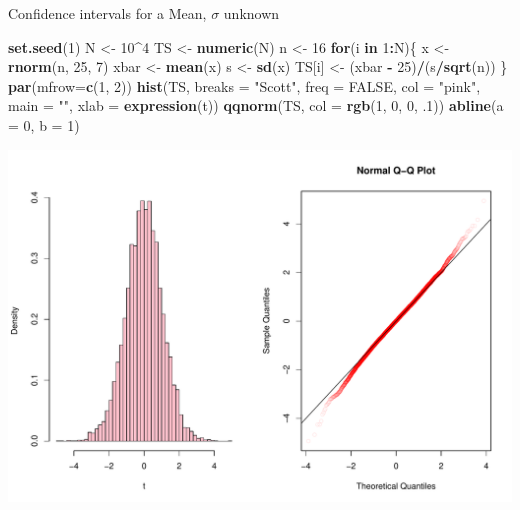 \documentclass[
  ignorenonframetext,
]{beamer}
\newenvironment{Shaded}{\begin{snugshade}}{\end{snugshade}}
\newcommand{\AttributeTok}[1]{\textcolor[rgb]{0.13,0.29,0.53}{#1}}
\newcommand{\ConstantTok}[1]{\textcolor[rgb]{0.56,0.35,0.01}{#1}}
\newcommand{\ControlFlowTok}[1]{\textcolor[rgb]{0.13,0.29,0.53}{\textbf{#1}}}
\newcommand{\DecValTok}[1]{\textcolor[rgb]{0.00,0.00,0.81}{#1}}
\newcommand{\FunctionTok}[1]{\textcolor[rgb]{0.13,0.29,0.53}{\textbf{#1}}}
\newcommand{\NormalTok}[1]{#1}
\newcommand{\OtherTok}[1]{\textcolor[rgb]{0.56,0.35,0.01}{#1}}
\newcommand{\SpecialCharTok}[1]{\textcolor[rgb]{0.81,0.36,0.00}{\textbf{#1}}}
\newcommand{\StringTok}[1]{\textcolor[rgb]{0.31,0.60,0.02}{#1}}
\begin{document}
\begin{frame}[fragile]{Confidence intervals for a Mean, \(\sigma\)
unknown}
\protect\hypertarget{confidence-intervals-for-a-mean-sigma-unknown-1}{}
\tiny

\begin{Shaded}
\begin{Highlighting}[]
\FunctionTok{set.seed}\NormalTok{(}\DecValTok{1}\NormalTok{)}
\NormalTok{N }\OtherTok{\textless{}{-}} \DecValTok{10}\SpecialCharTok{\^{}}\DecValTok{4}
\NormalTok{TS }\OtherTok{\textless{}{-}} \FunctionTok{numeric}\NormalTok{(N)}
\NormalTok{n }\OtherTok{\textless{}{-}} \DecValTok{16}
\ControlFlowTok{for}\NormalTok{(i }\ControlFlowTok{in} \DecValTok{1}\SpecialCharTok{:}\NormalTok{N)\{}
\NormalTok{  x }\OtherTok{\textless{}{-}} \FunctionTok{rnorm}\NormalTok{(n, }\DecValTok{25}\NormalTok{, }\DecValTok{7}\NormalTok{)}
\NormalTok{  xbar }\OtherTok{\textless{}{-}} \FunctionTok{mean}\NormalTok{(x)}
\NormalTok{  s }\OtherTok{\textless{}{-}} \FunctionTok{sd}\NormalTok{(x)}
\NormalTok{  TS[i] }\OtherTok{\textless{}{-}}\NormalTok{ (xbar }\SpecialCharTok{{-}} \DecValTok{25}\NormalTok{)}\SpecialCharTok{/}\NormalTok{(s}\SpecialCharTok{/}\FunctionTok{sqrt}\NormalTok{(n))}
\NormalTok{\}}
\FunctionTok{par}\NormalTok{(}\AttributeTok{mfrow=}\FunctionTok{c}\NormalTok{(}\DecValTok{1}\NormalTok{, }\DecValTok{2}\NormalTok{))}
\FunctionTok{hist}\NormalTok{(TS, }\AttributeTok{breaks =} \StringTok{"Scott"}\NormalTok{, }\AttributeTok{freq =} \ConstantTok{FALSE}\NormalTok{, }\AttributeTok{col =} \StringTok{"pink"}\NormalTok{, }\AttributeTok{main =} \StringTok{""}\NormalTok{, }\AttributeTok{xlab =} \FunctionTok{expression}\NormalTok{(t))}
\FunctionTok{qqnorm}\NormalTok{(TS, }\AttributeTok{col =} \FunctionTok{rgb}\NormalTok{(}\DecValTok{1}\NormalTok{, }\DecValTok{0}\NormalTok{, }\DecValTok{0}\NormalTok{, .}\DecValTok{1}\NormalTok{))}
\FunctionTok{abline}\NormalTok{(}\AttributeTok{a =} \DecValTok{0}\NormalTok{, }\AttributeTok{b =} \DecValTok{1}\NormalTok{)}
\end{Highlighting}
\end{Shaded}

\begin{center}\includegraphics[width=0.6\linewidth,height=0.4\textheight]{Week10_Lect_files/figure-beamer/unnamed-chunk-51-1} \end{center}
\normalsize
\end{frame}
\end{document}
